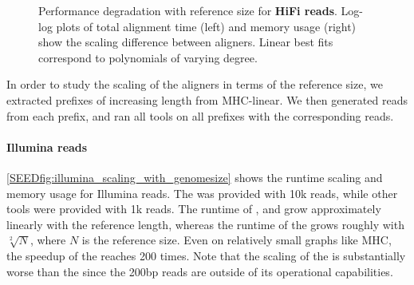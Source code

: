 \begin{figure}[t]
  \caption[Performance scaling with reference size
  (long reads)]{Performance degradation with reference size for \textbf{HiFi
  reads}. Log-log plots of total alignment time (left) and memory usage (right)
  show the scaling difference between aligners. Linear best fits correspond to
  polynomials of varying degree.}
  \label{SEEDfig:hifi_scaling_with_genomesize}
\end{figure}

In order to study the scaling of the aligners in terms of the reference size, we
extracted prefixes of increasing length from MHC-linear. We then generated reads
from each prefix, and ran all tools on all prefixes with the corresponding
reads.

\paragraph{Illumina reads}
\cref{SEEDfig:illumina_scaling_with_genomesize} shows the runtime scaling and memory
usage for Illumina reads. The \sh was provided with 10k reads, while other
tools were provided with 1k reads.
%
The runtime of \graphaligner, \pasgal and \vargas grow approximately linearly
with the reference length, whereas the runtime of the \sh grows roughly with
$\sqrt[2]{N}$, where $N$ is the reference size. Even on relatively small graphs
like MHC, the speedup of the \sh reaches 200 times. Note that the scaling of
the \prefixh is substantially worse than the \sh since the 200bp reads are
outside of its operational capabilities.

